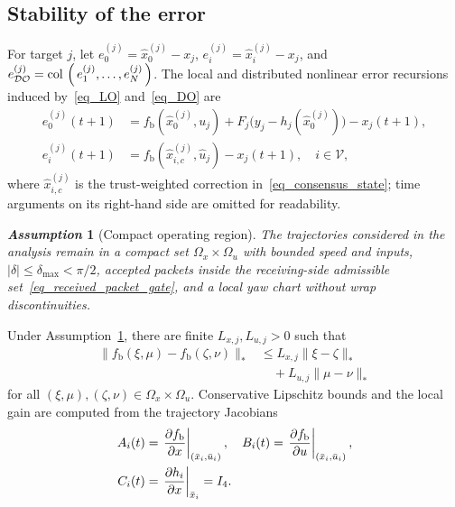 \documentclass[letterpaper,journal]{IEEEtran}
\def\col#1{\mathop{{\rm col}\,\left(\,#1\,\right)}}
\def\V{\mathcal{V}} %
\def\DO{\mathcal{DO}} %
\newtheorem{assumption}{\it Assumption}%
\begin{document}
\subsection{Stability of the error}\label{subsec_Prove}
For target $j$, let $e_0^{(j)}=\hat x_0^{(j)}-x_j$, $e_i^{(j)}=\hat x_i^{(j)}-x_j$, and $e_{\DO}^{(j)}=\col{e_1^{(j)},\ldots,e_N^{(j)}}$. The local and distributed nonlinear error recursions induced by~\eqref{eq_LO} and~\eqref{eq_DO} are
\begin{align}
e_0^{(j)}(t+1)
&=f_{\mathrm b}(\hat x_0^{(j)},u_j)
+F_j\big(y_j-h_j(\hat x_0^{(j)})\big)-x_j(t+1),
\label{eq_raw_e0}\\
e_i^{(j)}(t+1)
&=f_{\mathrm b}(\hat x_{i,c}^{(j)},\hat u_j)-x_j(t+1),\quad i\in\V,
\label{eq_raw_eDO}
\end{align}
where $\hat x_{i,c}^{(j)}$ is the trust-weighted correction in~\eqref{eq_consensus_state}; time arguments on its right-hand side are omitted for readability.
\begin{assumption}[Compact operating region]\label{ass_compact_region}
The trajectories considered in the analysis remain in a compact set $\Omega_x\times\Omega_u$ with bounded speed and inputs, $|\delta|\le\delta_{\max}<\pi/2$, accepted packets inside the receiving-side admissible set~\eqref{eq_received_packet_gate}, and a local yaw chart without wrap discontinuities.
\end{assumption}
Under Assumption~\ref{ass_compact_region}, there are finite $L_{x,j},L_{u,j}>0$ such that
\begin{equation}
\begin{aligned}
\|f_{\mathrm b}(\xi,\mu)-f_{\mathrm b}(\zeta,\nu)\|_*
&\le L_{x,j}\|\xi-\zeta\|_*\\
&\quad+L_{u,j}\|\mu-\nu\|_*
\end{aligned}
\label{eq_nonlinear_lipschitz}
\end{equation}
for all $(\xi,\mu),(\zeta,\nu)\in\Omega_x\times\Omega_u$. Conservative Lipschitz bounds and the local gain are computed from the trajectory Jacobians
\begin{align}
 A_i(t)&=\left.\frac{\partial f_{\mathrm b}}{\partial x}\right|_{(\bar x_i,\bar u_i)},\quad
 B_i(t)=\left.\frac{\partial f_{\mathrm b}}{\partial u}\right|_{(\bar x_i,\bar u_i)},\notag\\
 C_i(t)&=\left.\frac{\partial h_i}{\partial x}\right|_{\bar x_i}=I_4.
 \label{eq_bicycle_jacobian}
\end{align}
\end{document}
